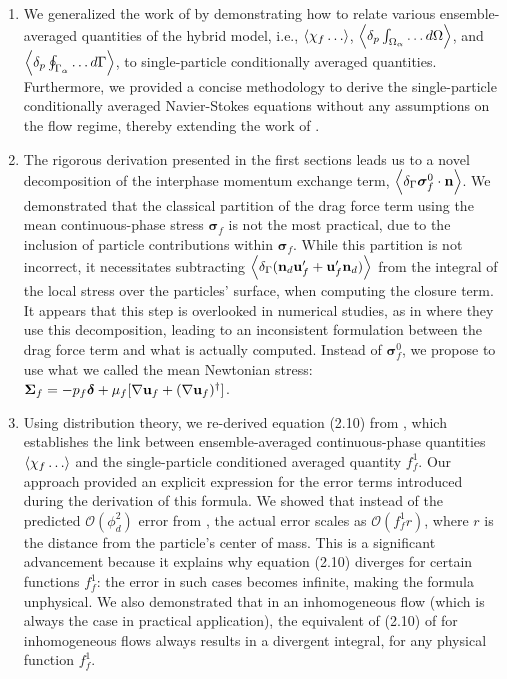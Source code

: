\begin{enumerate}
    \item We generalized the work of \citet{zhang1994ensemble} by demonstrating how to relate various ensemble-averaged quantities of the hybrid model, i.e., $\left<\chi_f\ldots\right>$, $\left<\delta_p \int_{\Omega_{\alpha}} \ldots d\Omega\right>$, and $\left<\delta_p \oint_{\Gamma_{\alpha}} \ldots d\Gamma\right>$, to single-particle conditionally averaged quantities. 
    Furthermore, we provided a concise methodology to derive the single-particle conditionally averaged Navier-Stokes equations without any assumptions on the flow regime, thereby extending the work of \citet{hinch1977averaged}. 
    \item The rigorous derivation presented in the first sections leads us to a novel decomposition of the interphase momentum exchange term, $\left<\delta_\Gamma \bm\sigma_f^0 \cdot \textbf{n}\right>$. 
    We demonstrated that the classical partition of the drag force term using the mean continuous-phase stress $\bm\sigma_f$ is not the most practical, due to the inclusion of particle contributions within $\bm\sigma_f$.
    While this partition is not incorrect, it necessitates subtracting $\left<\delta_\Gamma (\textbf{n}_d \textbf{u}_f' + \textbf{u}_f' \textbf{n}_d)\right>$ from the integral of the local stress over the particles' surface, when computing the closure term. 
    It appears that this step is overlooked in numerical studies, as in \citet{wang2021numerical,wang2024effect} where they use this decomposition, leading to an inconsistent formulation between the drag force term and what is actually computed.
    Instead of $\bm\sigma_f^0$, we propose to use what we called the mean Newtonian stress: $\bm\Sigma_f = -p_f \bm\delta + \mu_f [\mathbf{\nabla} \textbf{u}_f + (\mathbf{\nabla} \textbf{u}_f)^\dagger]$. 
    \item Using distribution theory, we re-derived equation (2.10) from \citet{batchelor1972sedimentation}, which establishes the link between ensemble-averaged continuous-phase quantities $\left<\chi_f\ldots\right>$ and the single-particle conditioned averaged quantity $f_f^1$. 
    Our approach provided an explicit expression for the error terms introduced during the derivation of this formula.
    We showed that instead of the predicted $\mathcal{O}(\phi_d^2)$ error from \citet{batchelor1972sedimentation}, the actual error scales as $\mathcal{O}(f_f^1 r)$, where $r$ is the distance from the particle's center of mass. 
    This is a significant advancement because it explains why equation (2.10) diverges for certain functions $f_f^1$: the error in such cases becomes infinite, making the formula unphysical.
    We also demonstrated that in an inhomogeneous flow (which is always the case in practical application), the equivalent of (2.10) of \citet{batchelor1972sedimentation} for inhomogeneous flows always results in a divergent integral, for any physical function $f_f^1$.

\end{enumerate}
